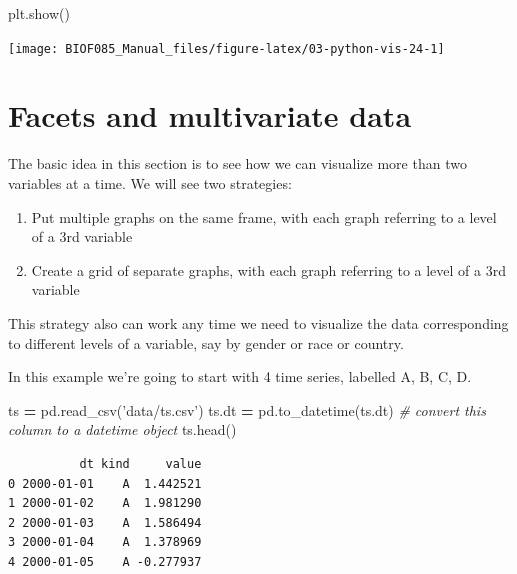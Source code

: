\documentclass[
  letterpaper,
]{scrbook}
\newenvironment{Shaded}{\begin{snugshade}}{\end{snugshade}}
\newcommand{\CommentTok}[1]{\textcolor[rgb]{0.56,0.35,0.01}{\textit{#1}}}
\newcommand{\NormalTok}[1]{#1}
\newcommand{\OperatorTok}[1]{\textcolor[rgb]{0.81,0.36,0.00}{\textbf{#1}}}
\newcommand{\StringTok}[1]{\textcolor[rgb]{0.31,0.60,0.02}{#1}}
\providecommand{\tightlist}{%
  \setlength{\itemsep}{0pt}\setlength{\parskip}{0pt}}
\begin{document}
\begin{Shaded}
\begin{Highlighting}[]
\NormalTok{plt.show()}
\end{Highlighting}
\end{Shaded}

\begin{center}\texttt{[image: BIOF085\_Manual\_files/figure-latex/03-python-vis-24-1]} \end{center}

\hypertarget{facets-and-multivariate-data}{%
\section{Facets and multivariate data}\label{facets-and-multivariate-data}}

The basic idea in this section is to see how we can visualize more than two variables at a time. We will see two strategies:

\begin{enumerate}
\def\labelenumi{\arabic{enumi}.}
\tightlist
\item
  Put multiple graphs on the same frame, with each graph referring to a level of a 3rd variable
\item
  Create a grid of separate graphs, with each graph referring to a level of a 3rd variable
\end{enumerate}

This strategy also can work any time we need to visualize the data corresponding to different levels of a variable, say by gender or race or country.

In this example we're going to start with 4 time series, labelled A, B, C, D.

\begin{Shaded}
\begin{Highlighting}[]
\NormalTok{ts }\OperatorTok{=}\NormalTok{ pd.read_csv(}\StringTok{'data/ts.csv'}\NormalTok{)}
\NormalTok{ts.dt }\OperatorTok{=}\NormalTok{ pd.to_datetime(ts.dt) }\CommentTok{# convert this column to a datetime object}
\NormalTok{ts.head()}
\end{Highlighting}
\end{Shaded}

\begin{verbatim}
          dt kind     value
0 2000-01-01    A  1.442521
1 2000-01-02    A  1.981290
2 2000-01-03    A  1.586494
3 2000-01-04    A  1.378969
4 2000-01-05    A -0.277937
\end{verbatim}
\end{document}
